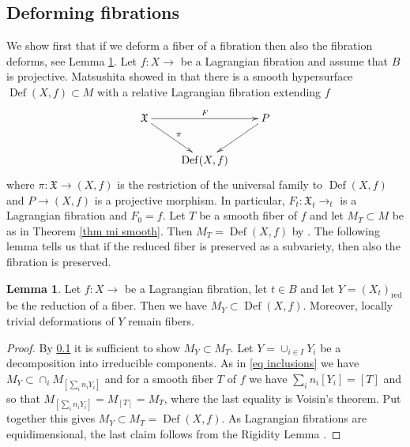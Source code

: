 \documentclass[a4paper,11pt,final]{amsart}
\theoremstyle{plain}
\theoremstyle{definition}
\newtheorem{lemma}[subsection]{Lemma}
\numberwithin{equation}{section}
\theoremstyle{remark}
\begin{document}
\enlargethispage{\baselineskip}

\subsection{Deforming fibrations}\label{subsec fibration deforms}
We show first that if we deform a fiber of a fibration then also the fibration deforms, see Lemma \ref{lemma my in mf}. 
Let $f:X{\xrightarrow{\ \ }}$ be a Lagrangian fibration and assume that $B$ is  projective. 
Matsushita showed in \cite[Corollary 1.2]{Matsus09} that there is a smooth hypersurface ${{\operatorname{Def}}}(X,f) \subset M$ with a relative Lagrangian fibration extending $f$
\[
\begin{xy}\xymatrix{
{{\mathfrak X}} \ar[dr]^\pi\ar[rr]^F && P \ar[dl]\\
&{{\operatorname{Def}}}(X,f) &
}\end{xy}
\]
where $\pi:{{\mathfrak X}} {\xrightarrow{\ \ }}(X,f) $ is the restriction of the universal family to ${{\operatorname{Def}}}(X,f) $  and $P{\xrightarrow{\ \ }}(X,f) $  is a projective morphism. In particular, $F_t:{{\mathfrak X}}_t {\xrightarrow{\ \ }}_t$ is a Lagrangian fibration and $F_0=f$. 
Let $T$ be a smooth fiber of $f$ and let $M_T\subset M$ be as in Theorem \ref{thm mi smooth}. Then $M_T={{\operatorname{Def}}}(X,f)$ by \cite[Proposition 2.1(3)]{Matsus09}. 
The following lemma tells us that if the reduced fiber is preserved as a subvariety, then also the fibration is preserved.
\begin{lemma}\label{lemma my in mf}
Let $f:X{\xrightarrow{\ \ }}$ be a Lagrangian fibration, let $t\in B$ and let $Y=\left(X_t\right)_{{\operatorname{red}}}$ be the reduction of a fiber. Then we have $M_Y \subset {{\operatorname{Def}}}(X,f) $. Moreover, locally trivial deformations of $Y$ remain fibers.
\end{lemma}
\begin{proof}
By \ref{subsec fibration deforms} it is sufficient to show $M_Y \subset M_T$. Let $Y=\cup_{i\in I} Y_i$ be a decomposition into irreducible components.
As in \eqref{eq inclusions} we have $M_Y \subset \cap_i M_{[\sum_i n_i Y_i]}$  and for a smooth fiber $T$ of $f$ we have $\sum_i n_i[Y_i] = [T]$ and so that $M_{[\sum_i n_i Y_i]} = M_{[T]} = M_T$,
where the last equality is Voisin's theorem. Put together this gives $M_Y\subset M_T = {{\operatorname{Def}}}(X,f) $. As Lagrangian fibrations are equidimensional, the last claim follows from the Rigidity Lemma \cite[Lem 1.6]{KM}. 
\end{proof}
\end{document}
